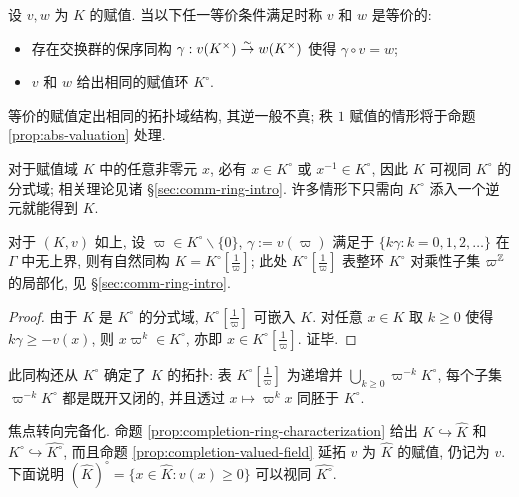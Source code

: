 \begin{definition}\label{def:valuation-equiv}
	设 $v, w$ 为 $K$ 的赋值. 当以下任一等价条件满足时称 $v$ 和 $w$ 是等价的:
	\begin{itemize}
		\item 存在交换群的保序同构 $\gamma: v(K^\times) \stackrel{\sim}{\rightarrow} w(K^\times)$ 使得 $\gamma \circ v = w$;
		\item $v$ 和 $w$ 给出相同的赋值环 $K^\circ$.
	\end{itemize}
\end{definition}
等价的赋值定出相同的拓扑域结构, 其逆一般不真; 秩 $1$ 赋值的情形将于命题 \ref{prop:abs-valuation} 处理.


对于赋值域 $K$ 中的任意非零元 $x$, 必有 $x \in K^\circ$ 或 $x^{-1} \in K^\circ$, 因此 $K$ 可视同 $K^\circ$ 的分式域; 相关理论见诸 \S\ref{sec:comm-ring-intro}. 许多情形下只需向 $K^\circ$ 添入一个逆元就能得到 $K$.

\begin{lemma}\label{prop:valuation-localization}
	对于 $(K, v)$ 如上, 设 $\varpi \in K^\circ \smallsetminus \{0\}$, $\gamma := v(\varpi)$ 满足于 $\{ k\gamma : k=0,1,2,\ldots \}$ 在 $\Gamma$ 中无上界, 则有自然同构 $K = K^\circ[\frac{1}{\varpi}]$; 此处 $K^\circ[\frac{1}{\varpi}]$ 表整环 $K^\circ$ 对乘性子集 $\varpi^{\mathbb{Z}}$ 的局部化, 见 \S\ref{sec:comm-ring-intro}.
\end{lemma}
\begin{proof}
	由于 $K$ 是 $K^\circ$ 的分式域, $K^\circ[\frac{1}{\varpi}]$ 可嵌入 $K$. 对任意 $x \in K$ 取 $k \geq 0$ 使得 $k\gamma \geq -v(x)$, 则 $x \varpi^k \in K^\circ$, 亦即 $x \in K^\circ[\frac{1}{\varpi}]$. 证毕.
\end{proof}
此同构还从 $K^\circ$ 确定了 $K$ 的拓扑: 表 $K^\circ[\frac{1}{\varpi}]$ 为递增并 $\bigcup_{k \geq 0} \varpi^{-k} K^\circ$, 每个子集 $\varpi^{-k} K^\circ$ 都是既开又闭的, 并且透过 $x \mapsto \varpi^k x$ 同胚于 $K^\circ$.

焦点转向完备化. 命题 \ref{prop:completion-ring-characterization} 给出 $K \hookrightarrow \hat{K}$ 和 $K^\circ \hookrightarrow \widehat{K^\circ}$, 而且命题 \ref{prop:completion-valued-field} 延拓 $v$ 为 $\hat{K}$ 的赋值, 仍记为 $v$. 下面说明 $(\hat{K})^\circ = \{ x \in \hat{K}: v(x) \geq 0 \} $ 可以视同 $\widehat{K^\circ}$.


